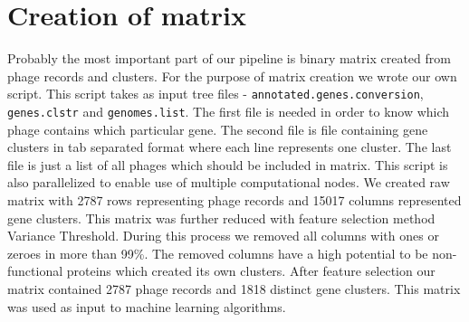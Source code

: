\section{Creation of matrix}
Probably the most important part of our pipeline is binary matrix created from phage records and clusters.
For the purpose of matrix creation we wrote our own script.
This script takes as input tree files - \verb|annotated.genes.conversion|, \verb|genes.clstr| and \verb|genomes.list|.
The first file is needed in order to know which phage contains which particular gene.
The second file is file containing gene clusters in tab separated format where each line represents one cluster.
The last file is just a list of all phages which should be included in matrix.
This script is also parallelized to enable use of multiple computational nodes.
We created raw matrix with 2787 rows representing phage records and 15017 columns represented gene clusters.
This matrix was further reduced with feature selection method Variance Threshold.
During this process we removed all columns with ones or zeroes in more than 99\%.
The removed columns have a high potential to be non-functional proteins which created its own clusters.
After feature selection our matrix contained 2787 phage records and 1818 distinct gene clusters.
This matrix was used as input to machine learning algorithms. 


